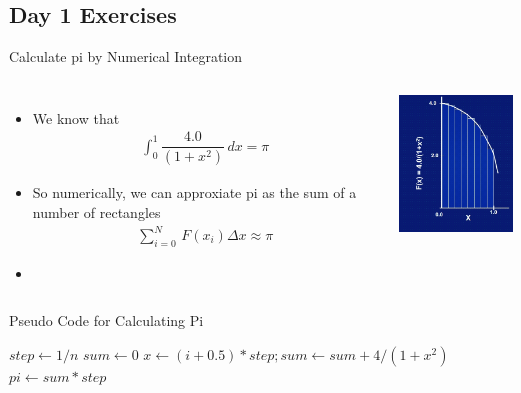 \documentclass[c,mathserif,compress,xcolor=svgnames]{beamer}
\begin{document}
\subsection{Day 1 Exercises}
\begin{frame}[allowframebreaks]{Calculate pi by Numerical Integration}
  \begin{columns}
    \column{5cm}
    \begin{itemize}
      \item We know that
      \begin{align*}
        \int^1_0 \dfrac{4.0}{(1+x^2)}\, dx = \pi
      \end{align*}
      \item So numerically, we can approxiate pi as the sum of a number of rectangles
      \begin{align*}
        \sum^N_{i=0}\,F(x_i)\Delta x \approx \pi
      \end{align*}
      \item[] 
    \end{itemize}
    \column{5cm}
    \begin{center}
      \includegraphics[width=4cm]{./graphics/pi}
    \end{center}
  \end{columns}

  \begin{algorithm}[H]
    \caption{Pseudo Code for Calculating Pi}
    \begin{algorithmic}
        \State $step \gets 1/n$
        \State $sum \gets 0$
        \State $x \gets (i+0.5)*step; sum \gets sum + 4/(1+x^2)$
        \EndDo
        \State $pi \gets sum * step$
        \EndFunction
    \end{algorithmic}
  \end{algorithm}
\end{frame}
\end{document}

